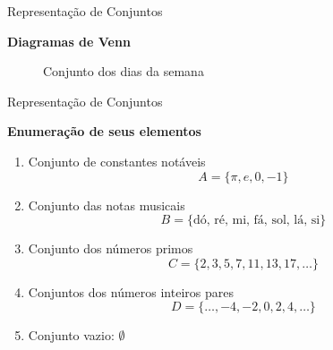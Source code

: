 \begin{frame}[fragile]{Representação de Conjuntos}

    \textbf{Diagramas de Venn}

    \begin{figure}
        \centering


        \caption{Conjunto dos dias da semana}

    \end{figure}

\end{frame}
\begin{frame}[fragile]{Representação de Conjuntos}

    \textbf{Enumeração de seus elementos}

    \vspace{0.1in}

    \begin{enumerate}
        \item Conjunto de constantes notáveis
        \[
            A = \lbrace \pi, e, 0, -1\rbrace
        \]

        \item Conjunto das notas musicais
        \[
            B = \lbrace \mbox{dó, ré, mi, fá, sol, lá, si}\rbrace
        \]

        \item Conjunto dos números primos
        \[
            C = \lbrace 2, 3, 5, 7, 11, 13, 17, \ldots \rbrace
        \]

        \item Conjuntos dos números inteiros pares
        \[
            D = \lbrace \ldots, -4, -2, 0, 2, 4, \ldots \rbrace
        \]

        \item Conjunto vazio: $\emptyset$
    \end{enumerate}
\end{frame}

